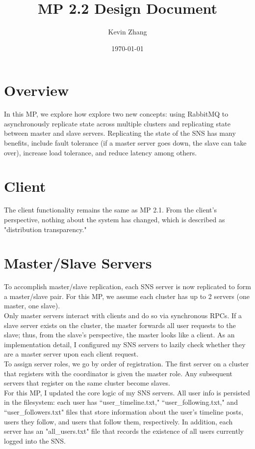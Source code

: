 \documentclass{article}
\title{MP 2.2 Design Document}
\author{Kevin Zhang}
\date{\today}
\begin{document}
\maketitle

\section{Overview}

In this MP, we explore how explore two new concepts: using RabbitMQ to asynchronously replicate state across multiple clusters and replicating state between master and slave servers. Replicating the state of the SNS has many benefits, include fault tolerance (if a master server goes down, the slave can take over), increase load tolerance, and reduce latency among others.

\section{Client}

The client functionality remains the same as MP 2.1. From the client's perspective, nothing about the system has changed, which is described as "distribution transparency."

\section{Master/Slave Servers}

To accomplish master/slave replication, each SNS server is now replicated to form a master/slave pair. For this MP, we assume each cluster has up to 2 servers (one master, one slave).\\

Only master servers interact with clients and do so via synchronous RPCs. If a slave server exists on the cluster, the master forwards all user requests to the slave; thus, from the slave's perspective, the master looks like a client. As an implementation detail, I configured my SNS servers to lazily check whether they are a master server upon each client request.\\

To assign server roles, we go by order of registration. The first server on a cluster that registers with the coordinator is given the master role. Any subsequent servers that register on the same cluster become slaves.\\

For this MP, I updated the core logic of my SNS servers. All user info is persisted in the filesystem: each user has ``user\_timeline.txt," ``user\_following.txt," and ``user\_followers.txt" files that store information about the user's timeline posts, users they follow, and users that follow them, respectively. In addition, each server has an "all\_users.txt" file that records the existence of all users currently logged into the SNS.\\
\end{document}
